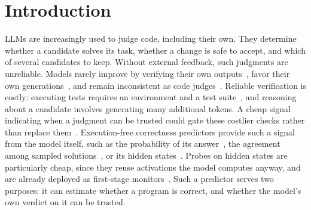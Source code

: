 \section{Introduction}
\label{sec:intro}
LLMs are increasingly used to judge code, including their own. They determine whether a candidate solves
its task, whether a change is safe to accept, and which of several candidates to
keep. Without external feedback, such judgments are unreliable. Models rarely
improve by verifying their own outputs~\cite{Huang2024SelfCorrect,
Kamoi2024SelfCorrection}, favor their own generations~\cite{Panickssery2024Self},
and remain inconsistent as code judges~\cite{Jiang2025CodeJudgeBench}. Reliable
verification is costly: executing tests requires an environment and a test
suite~\cite{Raghavendra2026Rubrics}, and reasoning about a candidate involves generating many additional
tokens. A cheap signal indicating when a judgment can be trusted could gate
these costlier checks rather than replace them~\cite{Rakasi2026Uncertainty,
jung2025trust}. Execution-free correctness predictors provide such a signal from
the model itself, such as the probability of its
answer~\cite{Spiess2025Calib, Campos2026Multicalib}, the agreement among sampled
solutions~\cite{Chen24Eigenscore, shi2026codemorethantext,
bouchard2026functional}, or its hidden states~\cite{bui2025openia,
Vu2026Autoprobe, ribeiro2026repe}. Probes on hidden states are particularly
cheap, since they reuse activations the model computes anyway, and are already
deployed as first-stage monitors~\cite{McKenzie2025HighStakes,
Kramar2026Probes}. Such a predictor serves two purposes: it can estimate whether
a program is correct, and whether the model's own verdict on it can be trusted.

